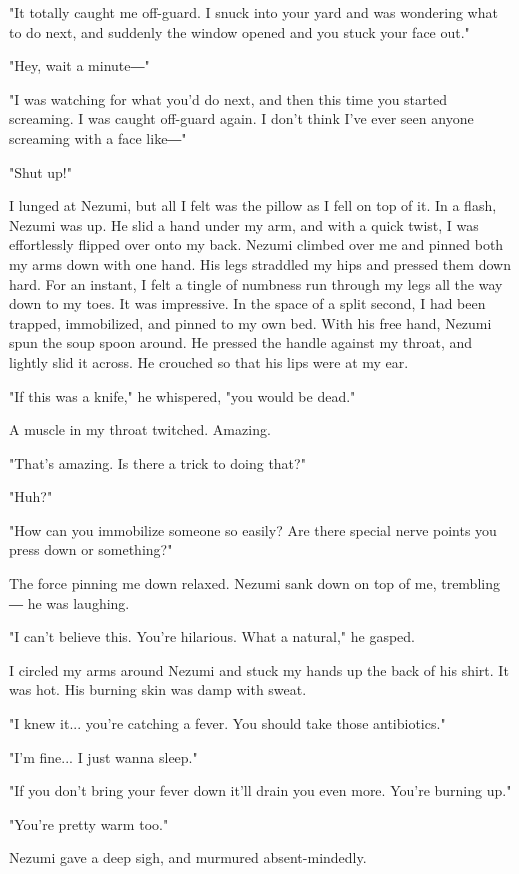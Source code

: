 "It totally caught me off-guard. I snuck into your yard and was
wondering what to do next, and suddenly the window opened and you stuck
your face out."

"Hey, wait a minute―"

"I was watching for what you'd do next, and then this time you started
screaming. I was caught off-guard again. I don't think I've ever seen
anyone screaming with a face like―"

"Shut up!"

I lunged at Nezumi, but all I felt was the pillow as I fell on top of
it. In a flash, Nezumi was up. He slid a hand under my arm, and with a
quick twist, I was effortlessly flipped over onto my back. Nezumi
climbed over me and pinned both my arms down with one hand. His legs
straddled my hips and pressed them down hard. For an instant, I felt a
tingle of numbness run through my legs all the way down to my toes. It
was impressive. In the space of a split second, I had been trapped,
immobilized, and pinned to my own bed. With his free hand, Nezumi spun
the soup spoon around. He pressed the handle against my throat, and
lightly slid it across. He crouched so that his lips were at my ear.

"If this was a knife," he whispered, "you would be dead."

A muscle in my throat twitched. Amazing.

"That's amazing. Is there a trick to doing that?"

"Huh?"

"How can you immobilize someone so easily? Are there special nerve
points you press down or something?"

The force pinning me down relaxed. Nezumi sank down on top of me,
trembling ― he was laughing.

"I can't believe this. You're hilarious. What a natural," he gasped.

I circled my arms around Nezumi and stuck my hands up the back of his
shirt. It was hot. His burning skin was damp with sweat.

"I knew it... you're catching a fever. You should take those
antibiotics."

"I'm fine... I just wanna sleep."

"If you don't bring your fever down it'll drain you even more. You're
burning up."

"You're pretty warm too."

Nezumi gave a deep sigh, and murmured absent-mindedly.

